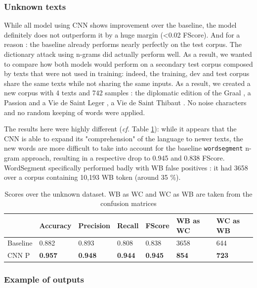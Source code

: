 \documentclass{jdmdh}
\begin{document}
\subsubsection{Unknown texts}

While all model using CNN shows improvement over the baseline, the model definitely does not outperform it by a huge margin (\textless 0.02 FScore). And for a reason : the baseline already performs nearly perfectly on the test corpus. The dictionary attack using n-grams did actually perform well. As a result, we wanted to compare how both models would perform on a secondary test corpus composed by texts that were not used in training: indeed, the training, dev and test corpus share the same texts while not sharing the same inputs. As a result, we created a new corpus with 4 texts and 742 samples : the diplomatic edition of the Graal \citet{graal}, a Passion and a Vie de Saint Leger \citet{old_french_corpus}, a Vie de Saint Thibaut \citet{theobaldus}. No noise characters and no random keeping of words were applied.

The results here were highly different (\textit{cf.} Table \ref{tab:scores_unknown}): while it appears that the CNN is able to expand its "comprehension" of the language to newer texts, the new words are more difficult to take into account for the baseline \texttt{wordsegment} n-gram approach, resulting in a respective drop to 0.945 and 0.838 FScore. WordSegment specifically performed badly with WB false positives : it had 3658 over a corpus containing 10,193 WB token (around 35 \%).

\begin{table}[!ht]
\centering
\begin{tabular}{lllllll}
\hline
 & Accuracy & Precision & Recall & FScore & WB as WC & WC as WB \\ \hline
Baseline & 0.882 & 0.893 & 0.808 & 0.838 & 3658 & 644 \\
CNN P & \textbf{0.957} & \textbf{0.948} & \textbf{0.944} & \textbf{0.945} & \textbf{854} & \textbf{723} \\ \hline
\end{tabular}
\caption{Scores over the unknown dataset. WB as WC and WC as WB are taken from the confusion matrices}
\label{tab:scores_unknown}
\end{table}

\subsubsection{Example of outputs}
\end{document}
